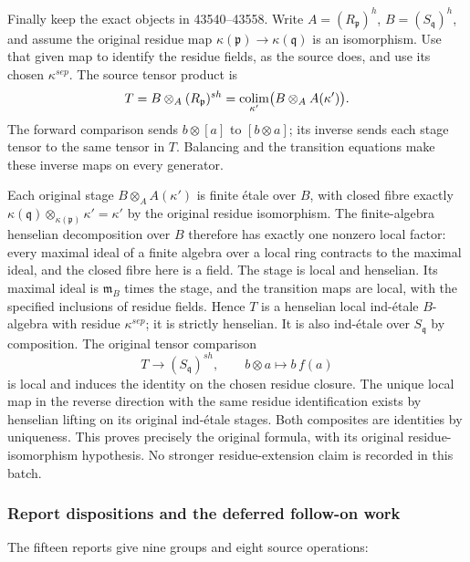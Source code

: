 Finally keep the exact objects in 43540--43558. Write \(A=(R_{\mathfrak p})^h\), \(B=(S_{\mathfrak q})^h\), and assume the original residue map \(\kappa(\mathfrak p)\to\kappa(\mathfrak q)\) is an isomorphism. Use that given map to identify the residue fields, as the source does, and use its chosen \(\kappa^{sep}\). The source tensor product is \[
 T=B\otimes_A(R_{\mathfrak p})^{sh}
   =\mathop{\rm colim}_{\kappa'}\bigl(B\otimes_A A(\kappa')\bigr).
\] The forward comparison sends \(b\otimes[a]\) to \([b\otimes a]\); its inverse sends each stage tensor to the same tensor in \(T\). Balancing and the transition equations make these inverse maps on every generator.

Each original stage \(B\otimes_A A(\kappa')\) is finite étale over \(B\), with closed fibre exactly \(\kappa(\mathfrak q)\otimes_{\kappa(\mathfrak p)}\kappa'=\kappa'\) by the original residue isomorphism. The finite-algebra henselian decomposition over \(B\) therefore has exactly one nonzero local factor: every maximal ideal of a finite algebra over a local ring contracts to the maximal ideal, and the closed fibre here is a field. The stage is local and henselian. Its maximal ideal is \(\mathfrak m_B\) times the stage, and the transition maps are local, with the specified inclusions of residue fields. Hence \(T\) is a henselian local ind-étale \(B\)-algebra with residue \(\kappa^{sep}\); it is strictly henselian. It is also ind-étale over \(S_{\mathfrak q}\) by composition. The original tensor comparison \[
 T\longrightarrow(S_{\mathfrak q})^{sh},\qquad
 b\otimes a\longmapsto b\,f(a)
\] is local and induces the identity on the chosen residue closure. The unique local map in the reverse direction with the same residue identification exists by henselian lifting on its original ind-étale stages. Both composites are identities by uniqueness. This proves precisely the original formula, with its original residue-isomorphism hypothesis. No stronger residue-extension claim is recorded in this batch.

\subsubsection{Report dispositions and the deferred follow-on work}\label{algebra-proof-060-report-dispositions-and-the-deferred-follow-on-work}

The fifteen reports give nine groups and eight source operations:

